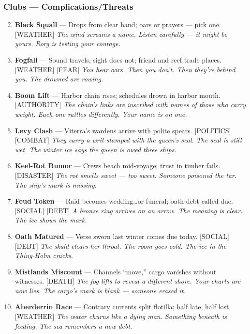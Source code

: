 \subsubsection*{Clubs --- Complications/Threats}
\label{sec:linn-complications}
\begin{enumerate}
\setcounter{enumi}{1}
\item \textbf{Black Squall} --- Drops from clear band; oars or prayers --- pick one. [WEATHER]
  \hfill \textit{The wind screams a name. Listen carefully --- it might be yours. Rorg is testing your courage.}
\item \textbf{Fogfall} --- Sound travels, sight does not; friend and reef trade places. [WEATHER] [FEAR]
  \hfill \textit{You hear oars. Then you don't. Then they're behind you. The drowned are rowing.}
\item \textbf{Boom Lift} --- Harbor chain rises; schedules drown in harbor mouth. [AUTHORITY]
  \hfill \textit{The chain's links are inscribed with names of those who carry weight. Each one rattles differently. Your name is on one.}
\item \textbf{Levy Clash} --- Viterra's wardens arrive with polite spears. [POLITICS] [COMBAT]
  \hfill \textit{They carry a writ stamped with the queen's seal. The seal is still wet. The winter ice says the queen is owed three ships.}
\item \textbf{Keel-Rot Rumor} --- Crews beach mid-voyage; trust in timber fails. [DISASTER]
  \hfill \textit{The rot smells sweet --- too sweet. Someone poisoned the tar. The ship's mark is missing.}
\item \textbf{Feud Token} --- Raid becomes wedding\dots or funeral; oath-debt called due. [SOCIAL] [DEBT]
  \hfill \textit{A bronze ring arrives on an arrow. The meaning is clear. The ice shows the mark.}
\item \textbf{Oath Matured} --- Verse sworn last winter comes due today. [SOCIAL] [DEBT]
  \hfill \textit{The skald clears her throat. The room goes cold. The ice in the Thing-Holm cracks.}
\item \textbf{Mistlands Miscount} --- Channels ``move,'' cargo vanishes without witnesses. [DEATH]
  \hfill \textit{The fog lifts to reveal a different shore. Your charts are now lies. The cargo's mark is blank --- someone erased it.}
\item \textbf{Aberderrin Race} --- Contrary currents split flotilla; half late, half lost. [WEATHER]
  \hfill \textit{The water churns like a dying man. Something beneath is feeding. The sea remembers a new debt.}

\end{enumerate}
